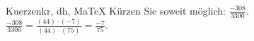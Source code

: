\begin{MAufgabe}{Kuerzen}{kr, dh, MaTeX}
K\"urzen Sie soweit m\"oglich: $\frac{-308}{3300}$.\\ 
\ifLsg\MLoesung
\quad $\frac{-308}{3300}=\frac{(44)\cdot(-7)}{(44)\cdot(75)}=\frac{-7}{75}$.\else\relax\fi
 \end{MAufgabe}